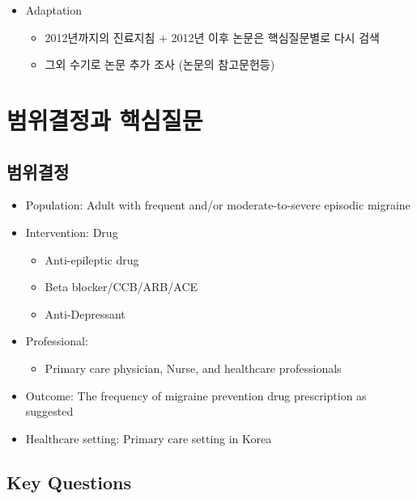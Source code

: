 \documentclass[]{book}
\providecommand{\tightlist}{%
  \setlength{\itemsep}{0pt}\setlength{\parskip}{0pt}}
\begin{document}
\begin{itemize}
\item
  Adaptation

  \begin{itemize}
  \item
    2012년까지의 진료지침 + 2012년 이후 논문은 핵심질문별로 다시 검색
  \item
    그외 수기로 논문 추가 조사 (논문의 참고문헌등)
  \end{itemize}
\end{itemize}

\hypertarget{section-14}{%
\chapter{범위결정과 핵심질문}\label{section-14}}

\hypertarget{section-15}{%
\section{범위결정}\label{section-15}}

\begin{itemize}
\item
  Population: Adult with frequent and/or moderate-to-severe episodic migraine
\item
  Intervention: Drug

  \begin{itemize}
  \tightlist
  \item
    Anti-epileptic drug
  \item
    Beta blocker/CCB/ARB/ACE
  \item
    Anti-Depressant
  \end{itemize}
\item
  Professional:

  \begin{itemize}
  \tightlist
  \item
    Primary care physician, Nurse, and healthcare professionals
  \end{itemize}
\item
  Outcome: The frequency of migraine prevention drug prescription as suggested
\item
  Healthcare setting: Primary care setting in Korea
\end{itemize}

\hypertarget{key-questions}{%
\section{Key Questions}\label{key-questions}}
\end{document}
